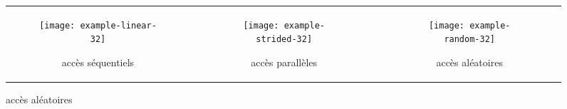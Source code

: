 \begin{figure}
	\begin{tabular}{c c c}
		\begin{subfigure}{0.3\linewidth}
			\texttt{[image: example-linear-32]}
			\caption{\label{fig:pattern-visual-linear}accès séquentiels}
		\end{subfigure} &
		\begin{subfigure}{0.3\linewidth}
			\texttt{[image: example-strided-32]}
			\caption{\label{fig:pattern-visual-strided}accès parallèles}
		\end{subfigure} &
		\begin{subfigure}{0.3\linewidth}
			\texttt{[image: example-random-32]}
			\caption{\label{fig:pattern-visual-random}accès aléatoires}
		\end{subfigure} \\
		

\end{tabular}
\end{figure}
